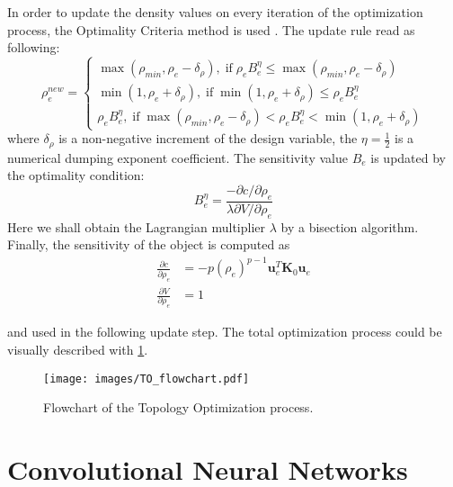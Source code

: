 In order to update the density values on every iteration of the optimization process, the Optimality Criteria method is used \cite{to_simp, to_99line}.
The update rule read as following:
\[ \rho^{new}_{e} = 
\begin{cases}
	\max(\rho_{min},\rho_{e}-\delta_{\rho}) , \; \mathrm{if} \; \rho_{e}B^{\eta}_{e} \leq \max(\rho_{min},\rho_{e}-\delta_{\rho}) \\
	\min(1,\rho_{e}+\delta_{\rho}), \; \mathrm{if} \; \min(1,\rho_{e}+\delta_{\rho}) \leq \rho_{e}B^{\eta}_{e}\\
	\rho_{e}B^{\eta}_{e}, \; \mathrm{if} \; \max(\rho_{min},\rho_{e}-\delta_{\rho}) < \rho_{e}B^{\eta}_{e} < \min(1,\rho_{e}+\delta_{\rho}) 
\end{cases}
\]
where $\delta_{\rho}$ is a non-negative increment of the design variable, the $\eta = \frac{1}{2} $ is a numerical dumping exponent coefficient.
The sensitivity value $B_{e}$ is updated by the optimality condition:
\begin{equation}
	B^{\eta}_{e} = \frac{-\partial c / \partial \rho_{e}}{\lambda \partial V / \partial \rho_{e}}
\end{equation}
Here we shall obtain the Lagrangian multiplier $\lambda$ by a bisection algorithm.
Finally, the sensitivity of the object is computed as 
\begin{align*}
	\frac{\partial c}{\partial \rho_{e}} & = -p(\rho_{e})^{p-1} \mathbf{u}^{T}_{e} \mathbf{K}_{0} \mathbf{u}_{e}\\
	\frac{\partial V}{\partial \rho_{e}} & = 1
\end{align*}

and used in the following update step.
The total optimization process could be visually described with \ref{fig:to_flow}.

\begin{figure}[]
	\centering
	\texttt{[image: images/TO\_flowchart.pdf]}
	\caption{Flowchart of the Topology Optimization process.}
	\label{fig:to_flow}
\end{figure}



\section{Convolutional Neural Networks}


